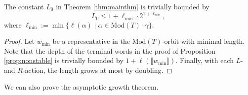 \documentclass{article}
\begin{document}
	\begin{lemma}\label{lem:boundL0}
		The constant $L_0$ in Theorem \ref{thm:mainthm} is trivially bounded by 
		\[
		L_0\leq 1+\ell_\mathrm{min}\cdot 2^{1+\ell_\mathrm{min}},
		\]
		where $\ell_\mathrm{min}:=\min\{\ell(\alpha)\mid \alpha\in\mathrm{Mod}(T)\cdot\gamma\}$.
	\end{lemma}
	\begin{proof}
		Let $w_\mathrm{min}$ be a representative in the $\mathrm{Mod}(T)$-orbit with minimal length. Note that the depth of the terminal words in the proof of Proposition \ref{prop:nonstable} is trivially bounded by $1+\ell(\llbracket w_\mathrm{min}\rrbracket)$. Finally, with each $L$- and $R$-action, the length grows at most by doubling.
	\end{proof}
	
	We can also prove the asymptotic growth theorem.
	
\end{document}
